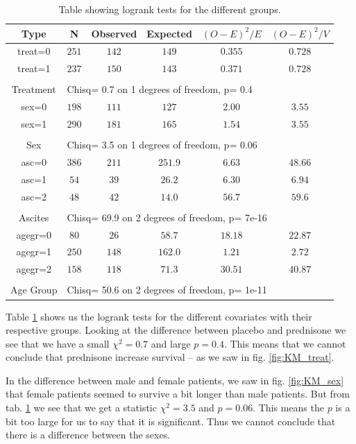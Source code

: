 \documentclass[a4paper,norsk, 10pt]{article}
\begin{document}
\begin{table}[!htb]
\centering
\begin{tabular}{c|c|c|c|c|c}
Type & N & Observed & Expected & $(O-E)^2/E$ & $(O-E)^2/V$ \\
\hline 
treat=0 & $251$ & $142$ &  $149$&  $0.355$&  $0.728$ \\
treat=1 & $237$ & $150$ &  $143$&  $0.371$&  $0.728$ \\
\hline\\
Treatment & \multicolumn{5}{l}{Chisq= 0.7  on 1 degrees of freedom, p= 0.4}\\
\hline
\hline
sex=0 & $198$ & $111$ &  $127$&  $2.00$&  $3.55$ \\
sex=1 & $290$ & $181$ &  $165$&  $1.54$&  $3.55$ \\
\hline\\
Sex & \multicolumn{5}{l}{Chisq= 3.5  on 1 degrees of freedom, p= 0.06}\\
\hline
\hline
asc=0 & $386$ & $211$ &  $251.9$&  $6.63$&  $48.66$ \\
asc=1 & $54$ & $39$ &  $26.2$&  $6.30$&  $6.94$ \\
asc=2 & $48$ & $42$ &  $14.0$&  $56.7$&  $59.6$ \\
\hline\\
Ascites & \multicolumn{5}{l}{Chisq= 69.9  on 2 degrees of freedom, p= 7e-16 }\\
\hline
\hline
agegr=0 & $80$ & $26$ &  $58.7$&  $18.18$&  $22.87$ \\
agegr=1 & $250$ & $148$ &  $162.0$&  $1.21$&  $2.72$ \\
agegr=2 & $158$ & $118$ &  $71.3$&  $30.51$&  $40.87$ \\
\hline\\
Age Group & \multicolumn{5}{l}{Chisq= 50.6  on 2 degrees of freedom, p= 1e-11}\\
\end{tabular}
\caption{Table showing logrank tests for the different groups.}\label{tab:logrank}
\end{table}


Table \ref{tab:logrank} shows us the logrank tests for the different covariates with their respective groups. Looking at the difference between placebo and prednisone we see that we have a small $\chi^2 = 0.7$ and large $p=0.4$. This means that we cannot conclude that prednisone increase survival -- as we saw in fig. \ref{fig:KM_treat}.

In the difference between male and female patients, we saw in fig. \ref{fig:KM_sex} that female patients seemed to survive a bit longer than male patients. But from tab. \ref{tab:logrank} we see that we get a statistic $\chi^2 = 3.5$ and $p=0.06$. This means the $p$ is a bit too large for us to say that it is significant. Thus we cannot conclude that there is a difference between the sexes.
\end{document}
